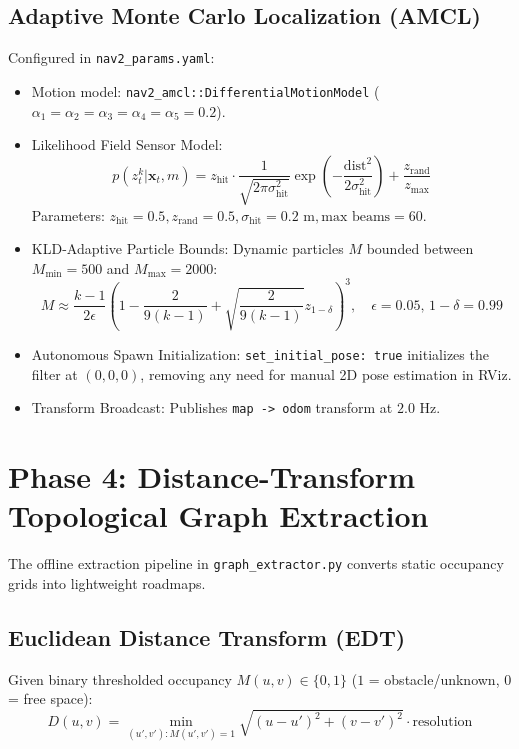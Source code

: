 \documentclass[10pt,a4paper]{article}
\begin{document}
\subsection{Adaptive Monte Carlo Localization (AMCL)}
Configured in \texttt{nav2\_params.yaml}:
\begin{itemize}
    \item Motion model: \texttt{nav2\_amcl::DifferentialMotionModel} ($\alpha_1 = \alpha_2 = \alpha_3 = \alpha_4 = \alpha_5 = 0.2$).
    \item Likelihood Field Sensor Model:
    \begin{equation}
    p(z_t^k | \mathbf{x}_t, m) = z_{\text{hit}} \cdot \frac{1}{\sqrt{2\pi\sigma_{\text{hit}}^2}}\exp\left(-\frac{\text{dist}^2}{2\sigma_{\text{hit}}^2}\right) + \frac{z_{\text{rand}}}{z_{\text{max}}}
    \end{equation}
    Parameters: $z_{\text{hit}} = 0.5, z_{\text{rand}} = 0.5, \sigma_{\text{hit}} = 0.2\text{ m}, \text{max beams} = 60$.
    \item KLD-Adaptive Particle Bounds: Dynamic particles $M$ bounded between $M_{\text{min}} = 500$ and $M_{\text{max}} = 2000$:
    \begin{equation}
    M \approx \frac{k - 1}{2\epsilon} \left(1 - \frac{2}{9(k-1)} + \sqrt{\frac{2}{9(k-1)}} z_{1-\delta}\right)^3, \quad \epsilon = 0.05, \, 1-\delta = 0.99
    \end{equation}
    \item Autonomous Spawn Initialization: \texttt{set\_initial\_pose: true} initializes the filter at $(0, 0, 0)$, removing any need for manual 2D pose estimation in RViz.
    \item Transform Broadcast: Publishes \texttt{map -> odom} transform at $2.0\text{ Hz}$.
\end{itemize}

\section{Phase 4: Distance-Transform Topological Graph Extraction}

The offline extraction pipeline in \texttt{graph_extractor.py} converts static occupancy grids into lightweight roadmaps.

\subsection{Euclidean Distance Transform (EDT)}
Given binary thresholded occupancy $M(u,v) \in \{0, 1\}$ ($1$ = obstacle/unknown, $0$ = free space):
\begin{equation}
D(u, v) = \min_{(u', v'): M(u', v') = 1} \sqrt{(u - u')^2 + (v - v')^2} \cdot \text{resolution}
\end{equation}
\end{document}
